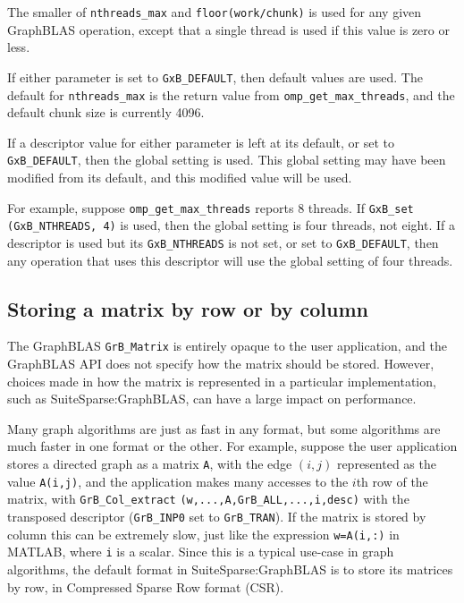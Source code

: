 \documentclass[12pt]{article}
\begin{document}
The smaller of \verb'nthreads_max' and \verb'floor(work/chunk)' is used for any
given GraphBLAS operation, except that a single thread is used if this value is
zero or less.

If either parameter is set to \verb'GxB_DEFAULT', then default values are used.
The default for \verb'nthreads_max' is the return value from
\verb'omp_get_max_threads', and the default chunk size is currently 4096.

If a descriptor value for either parameter is left at its default, or set to
\verb'GxB_DEFAULT', then the global setting is used.  This global setting may
have been modified from its default, and this modified value will be used.

For example, suppose \verb'omp_get_max_threads' reports 8 threads.  If
\verb'GxB_set (GxB_NTHREADS, 4)' is used, then the global setting is four
threads, not eight.  If a descriptor is used but its \verb'GxB_NTHREADS' is not
set, or set to \verb'GxB_DEFAULT', then any operation that uses this descriptor
will use the global setting of four threads.

\subsection{Storing a matrix by row or by column}

The GraphBLAS \verb'GrB_Matrix' is entirely opaque to the user application, and
the GraphBLAS API does not specify how the matrix should be stored.  However,
choices made in how the matrix is represented in a particular implementation,
such as SuiteSparse:GraphBLAS, can have a large impact on performance.

Many graph algorithms are just as fast in any format, but some algorithms are
much faster in one format or the other.  For example, suppose the user
application stores a directed graph as a matrix \verb'A', with the edge $(i,j)$
represented as the value \verb'A(i,j)', and the application makes many accesses
to the $i$th row of the matrix, with \verb'GrB_Col_extract'
\verb'(w,...,A,GrB_ALL,...,i,desc)' with the transposed descriptor
(\verb'GrB_INP0' set to \verb'GrB_TRAN').  If the matrix is stored by column
this can be extremely slow, just like the expression \verb'w=A(i,:)' in MATLAB,
where \verb'i' is a scalar.  Since this is a typical use-case in graph
algorithms, the default format in SuiteSparse:GraphBLAS is to store its
matrices by row, in Compressed Sparse Row format (CSR).
\end{document}
